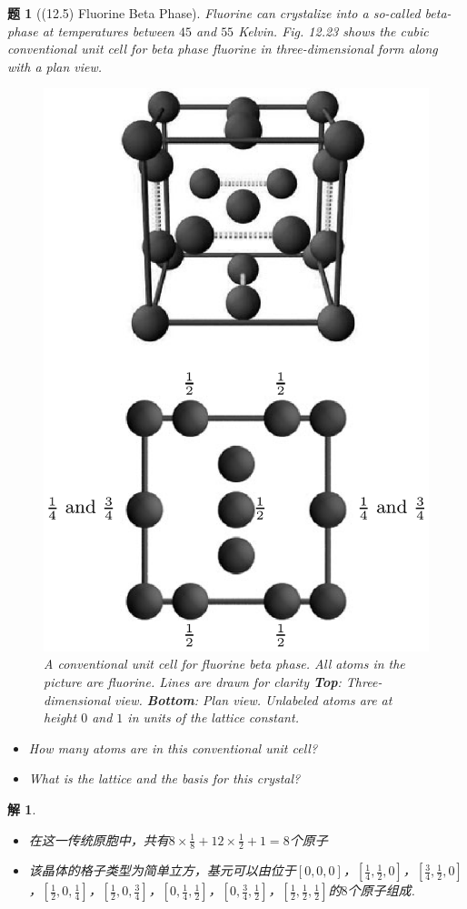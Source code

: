 \documentclass[UTF8,10pt,a4paper]{article}
\theoremstyle{Problem}
\newtheorem{prob}{题}
\theoremstyle{Solution}
\newtheorem*{sol}{解}
\begin{document}
\begin{prob}[(12.5) Fluorine Beta Phase]
    Fluorine can crystalize into a so-called beta-phase at temperatures between $45$ and $55$ Kelvin. Fig. 12.23 shows the cubic conventional unit cell for beta phase fluorine in three-dimensional form along with a plan view.
    \begin{figure}[h]
        \centering
        \includegraphics[width=.4\textwidth]{4.png}
        \caption{A conventional unit cell for fluorine beta phase. All atoms in the picture are fluorine. Lines are drawn for clarity \textbf{Top}: Three-dimensional view. \textbf{Bottom}: Plan view. Unlabeled atoms are at height $0$ and $1$ in units of the lattice constant.}
    \end{figure}
    \begin{itemize}
        \item[$\triangleright$] How many atoms are in this conventional unit cell?
        \item[$\triangleright$] What is the lattice and the basis for this crystal?
    \end{itemize}
\end{prob}
\begin{sol}
    \begin{itemize}
        \item[$\triangleright$] 在这一传统原胞中，共有$8\times\frac{1}{8}+12\times\frac{1}{2}+1=8$个原子
        \item[$\triangleright$] 该晶体的格子类型为简单立方，基元可以由位于$[0,0,0]$，$[\frac{1}{4},\frac{1}{2},0]$，$[\frac{3}{4},\frac{1}{2},0]$，$[\frac{1}{2},0,\frac{1}{4}]$，$[\frac{1}{2},0,\frac{3}{4}]$，$[0,\frac{1}{4},\frac{1}{2}]$，$[0,\frac{3}{4},\frac{1}{2}]$，$[\frac{1}{2},\frac{1}{2},\frac{1}{2}]$的$8$个原子组成.
    \end{itemize}
\end{sol}
\end{document}
